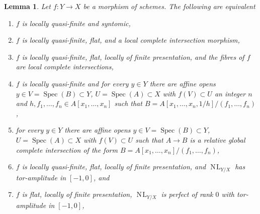 \documentclass[10pt,a4paper]{amsart}
\theoremstyle{plain}
\newtheorem{lemma}[subsection]{Lemma}
\theoremstyle{definition}
\theoremstyle{remark}
\numberwithin{equation}{subsection}
\def\Spec{\mathop{\mathrm{Spec}}}
\def\NL{\mathop{N\!L}\nolimits}
\begin{document}
\begin{lemma}
\label{lemma-syntomic-quasi-finite}
Let $f : Y \to X$ be a morphism of schemes. The following are equivalent
\begin{enumerate}
\item $f$ is locally quasi-finite and syntomic,
\item $f$ is locally quasi-finite, flat, and a local complete intersection
morphism,
\item $f$ is locally quasi-finite, flat, locally of finite presentation,
and the fibres of $f$ are local complete intersections,
\item $f$ is locally quasi-finite and for every $y \in Y$ there are
affine opens $y \in V = \Spec(B) \subset Y$, $U = \Spec(A) \subset X$
with $f(V) \subset U$ an integer $n$ and
$h, f_1, \ldots, f_n \in A[x_1, \ldots, x_n]$ such that
$B = A[x_1, \ldots, x_n, 1/h]/(f_1, \ldots, f_n)$,
\item for every $y \in Y$ there are affine opens
$y \in V = \Spec(B) \subset Y$, $U = \Spec(A) \subset X$
with $f(V) \subset U$ such that $A \to B$ is a relative global complete
intersection of the form $B = A[x_1, \ldots, x_n]/(f_1, \ldots, f_n)$,
\item $f$ is locally quasi-finite, flat, locally of finite presentation,
and $\NL_{Y/X}$ has tor-amplitude in $[-1, 0]$, and
\item $f$ is flat, locally of finite presentation,
$\NL_{Y/X}$ is perfect of rank $0$ with tor-amplitude in $[-1, 0]$,
\end{enumerate}
\end{lemma}
\end{document}
